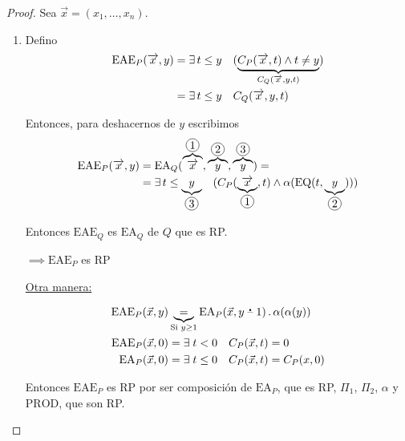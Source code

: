 \begin{proof} \phantom{.}

    Sea $\overrightarrow{x} = (x_1, \dotsc, x_n)$.

    \begin{enumerate}
    \item Defino
        \begin{align*}
            \mathrm{EAE}_P(\overrightarrow{x},y) &= \exists \, t \leq y \quad
            (\underbrace{C_P (\overrightarrow{x},t) \wedge t \neq y}_{%
            C_Q(\overrightarrow{x},y,t)}) \\
            &= \exists \, t \leq y \quad C_Q (\overrightarrow{x},y,t)
        \end{align*}

        Entonces, para deshacernos de $y$ escribimos
        \begin{align*}
            \mathrm{EAE}_P(\overrightarrow{x},y) &= 
            \mathrm{EA}_Q(\overbrace{\overrightarrow{x}}^{\circled{1}},
            \overbrace{y}^{\circled{2}}, \overbrace{y}^{\circled{3}}) = \\
            &= \exists \, t \leq \underbrace{y}_{\circled{3}} \quad 
                (C_P(\underbrace{\overrightarrow{x}}_{\circled{1}}, t) \wedge
            \alpha(\mathrm{EQ}(t, \underbrace{y}_{\circled{2}})))
        \end{align*}

        Entonces $\mathrm{EAE}_Q$ es $\mathrm{EA}_Q$ de $Q$ que es RP.
        \begin{center}
            $\implies \mathrm{EAE}_P$ es RP
        \end{center}

        \medskip

        \underline{Otra manera:}

        \begin{align*}
            \mathrm{EAE}_P (\vec{x}, y) &\underbrace{=}_{\text{Si } y\geq 1} 
            \mathrm{EA}_P (\vec{x}, y \;\accentset{\mbox{\large\bfseries .}}{\text{--}}\; 1) 
            \, . \, \alpha(\alpha(y)) \\
            \mathrm{EAE}_P (\vec{x}, 0) &= 
            \exists \; t < 0 \quad C_P (\vec{x}, t) = 0 \\
            \mathrm{EA}_P (\vec{x}, 0) &= 
            \exists \; t \leq 0 \quad C_P (\vec{x}, t) = C_P (x,0) \\
        \end{align*}

        Entonces $\mathrm{EAE}_P$ es RP por ser composición de $\mathrm{EA}_P$,
        que es RP,
        $\Pi_1$, $\Pi_2$, $\alpha$ y $\mathrm{PROD}$, que son RP.


\end{enumerate}
\end{proof}
